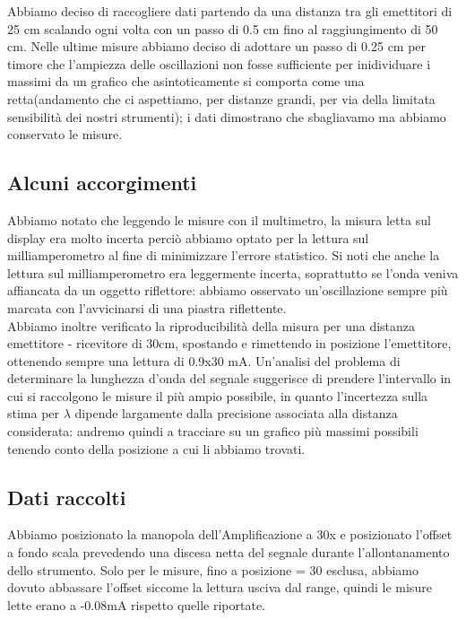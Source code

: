 \documentclass{article}
\theoremstyle{definition}
\begin{document}
Abbiamo deciso di raccogliere dati partendo da una distanza tra gli emettitori di 25 cm scalando ogni volta con un passo di 0.5 cm fino al raggiungimento di 50 cm. Nelle ultime misure abbiamo deciso di adottare un passo di 0.25 cm per timore che l'ampiezza delle oscillazioni non fosse sufficiente per inidividuare i massimi da un grafico che asintoticamente si comporta come una retta(andamento che ci aspettiamo, per distanze grandi, per via della limitata sensibilità dei nostri strumenti); i dati dimostrano che sbagliavamo ma abbiamo conservato le misure.\\

\subsection{Alcuni accorgimenti} 

Abbiamo notato che leggendo le misure con il multimetro, la misura letta sul display era molto incerta perciò abbiamo optato per la lettura sul milliamperometro al fine di minimizzare l'errore statistico. Si noti che anche la lettura sul milliamperometro era leggermente incerta, soprattutto se l'onda veniva affiancata da un oggetto riflettore: abbiamo osservato un'oscillazione sempre più marcata con l'avvicinarsi di una piastra riflettente.\\
Abbiamo inoltre verificato la riproducibilità della misura per una distanza emettitore - ricevitore di 30cm, spostando e rimettendo in posizione l'emettitore, ottenendo sempre una lettura di 0.9x30 mA. Un'analisi del problema di determinare la lunghezza d'onda del segnale suggerisce di prendere l'intervallo in cui si raccolgono le misure  il più ampio possibile, in quanto l'incertezza sulla stima per \(\lambda\) dipende largamente dalla precisione associata alla distanza considerata: andremo quindi a tracciare su un grafico più massimi possibili tenendo conto della posizione a cui li abbiamo trovati.

\subsection{Dati raccolti}

Abbiamo posizionato la manopola dell'Amplificazione a 30x e posizionato l'offset a fondo scala prevedendo una discesa netta del segnale durante l'allontanamento dello strumento. Solo per le misure, fino a posizione = 30 esclusa, abbiamo dovuto abbassare l'offset siccome la lettura usciva dal range, quindi le misure lette erano a -0.08mA rispetto quelle riportate.\\
\end{document}
